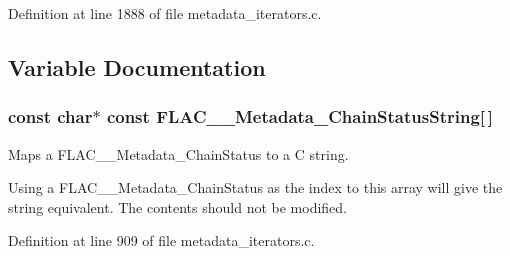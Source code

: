 Definition at line 1888 of file metadata\+\_\+iterators.\+c.



\subsection{Variable Documentation}
\subsubsection[{\texorpdfstring{F\+L\+A\+C\+\_\+\+\_\+\+Metadata\+\_\+\+Chain\+Status\+String}{FLAC__Metadata_ChainStatusString}}]{ {\bf const} char$\ast$ {\bf const} F\+L\+A\+C\+\_\+\+\_\+\+Metadata\+\_\+\+Chain\+Status\+String\mbox{[}$\,$\mbox{]}}\hypertarget{group__flac__metadata__level2_gabb4646b4af36d17497676759767f8cc7}{}\label{group__flac__metadata__level2_gabb4646b4af36d17497676759767f8cc7}
Maps a F\+L\+A\+C\+\_\+\+\_\+\+Metadata\+\_\+\+Chain\+Status to a C string.

Using a F\+L\+A\+C\+\_\+\+\_\+\+Metadata\+\_\+\+Chain\+Status as the index to this array will give the string equivalent. The contents should not be modified. 

Definition at line 909 of file metadata\+\_\+iterators.\+c.

